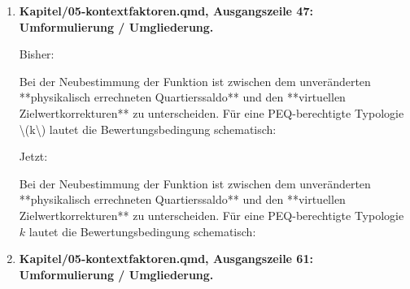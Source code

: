 \documentclass[
  ngerman,
  a4paper,
  DIV=11]{scrreprt}
\newenvironment{Shaded}{\begin{snugshade}}{\end{snugshade}}
\newcommand{\NormalTok}[1]{\textcolor[rgb]{0.00,0.23,0.31}{#1}}
\begin{document}
\begin{enumerate}
  Bisher:

\begin{Shaded}
\begin{Highlighting}[]
\NormalTok{Die Gleichung ist eine **physikalische Orientierung**, noch keine kalibrierte Anforderung. Eine Zielwertfunktion kann durch Parameter, eine Verschiebung der Dichteachse und eine Begrenzung der Gutschrift den Zusammenhang in eine Lastenverteilungsregel übersetzen. Die Parameter sind anhand der nationalen Gebäudeverteilung und Zielbilanz festzulegen [@schneider2023context, Gl. 7–8]. Gebäudeform, Verschattung, Dach{-} und Fassadennutzung bleiben Gegenstand der tatsächlichen Quartiersbilanz.}
\end{Highlighting}
\end{Shaded}

  Jetzt:

\begin{Shaded}
\begin{Highlighting}[]
\NormalTok{Die Gleichung beschreibt den physikalischen Zusammenhang; die Anforderung folgt aus der nationalen Kalibrierung. Eine Zielwertfunktion kann durch Parameter, eine Verschiebung der Dichteachse und eine Begrenzung der Gutschrift den Zusammenhang in eine Lastenverteilungsregel übersetzen. Die Parameter sind anhand der nationalen Gebäudeverteilung und Zielbilanz festzulegen [@schneider2023context, Gl. 7–8]. Gebäudeform, Verschattung, Dach{-} und Fassadennutzung bleiben Gegenstand der tatsächlichen Quartiersbilanz.}
\end{Highlighting}
\end{Shaded}
\item
  \textbf{Kapitel/05-kontextfaktoren.qmd, Ausgangszeile 47:
  Umformulierung / Umgliederung.}

  Bisher:

\begin{Shaded}
\begin{Highlighting}[]
\NormalTok{Bei der Neubestimmung der Funktion ist zwischen dem unveränderten **physikalisch errechneten Quartierssaldo** und den **virtuellen Zielwertkorrekturen** zu unterscheiden. Für eine PEQ{-}berechtigte Typologie \textbackslash{}(k\textbackslash{}) lautet die Bewertungsbedingung schematisch:}
\end{Highlighting}
\end{Shaded}

  Jetzt:

\begin{Shaded}
\begin{Highlighting}[]
\NormalTok{Bei der Neubestimmung der Funktion ist zwischen dem unveränderten **physikalisch errechneten Quartierssaldo** und den **virtuellen Zielwertkorrekturen** zu unterscheiden. Für eine PEQ{-}berechtigte Typologie $k$ lautet die Bewertungsbedingung schematisch:}
\end{Highlighting}
\end{Shaded}
\item
  \textbf{Kapitel/05-kontextfaktoren.qmd, Ausgangszeile 61:
  Umformulierung / Umgliederung.}


\end{enumerate}
\end{document}

